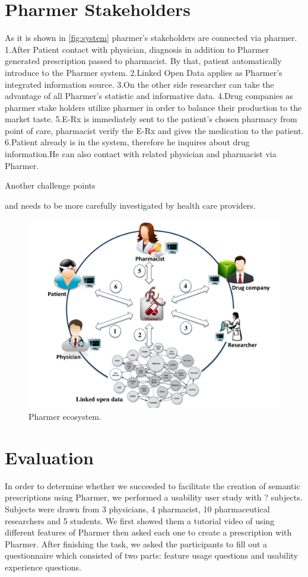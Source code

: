 \documentclass[10pt, conference, compsocconf]{IEEEtran}
\begin{document}
\section{Pharmer Stakeholders}
\label{sec:stake}

As it is shown in \autoref{fig:system} pharmer's stakeholders are connected via pharmer.
1.After Patient contact with physician, diagnosis in addition to Pharmer generated prescription passed to pharmacist. By that, patient automatically introduce to the Pharmer system.
2.Linked Open Data applies as Pharmer's integrated information source.
3.On the other side researcher can take the advantage of all Pharmer's statistic and informative data.
4.Drug companies as pharmer stake holders utilize pharmer in order to balance their production to the market taste.
5.E-Rx is immediately sent to the patient’s chosen pharmacy from point of care, pharmacist verify the E-Rx and gives the medication to the patient.
6.Patient already is in the system, therefore he inquires about drug information.He can also contact with related physician and pharmacist via Pharmer.


Another challenge points

 and needs to be more carefully investigated by health care providers.

\begin{figure}[tb]
	\centering
		\includegraphics[width=1.0\columnwidth]{images/system.pdf}
	\caption{Pharmer ecosystem.}
	\label{fig:system}
\end{figure}



\section{Evaluation}
\label{evaluation}
In order to determine whether we succeeded to facilitate the creation of semantic prescriptions using Pharmer, we performed a usability user study with ? subjects.
Subjects were drawn from 3 physicians, 4 pharmacist, 10 pharmaceutical researchers and 5 students.
We first showed them a tutorial video of using different features of Pharmer then asked each one to create a prescription with Pharmer.
After finishing the task, we asked the participants to fill out a questionnaire which consisted of two parts: feature usage questions and usability experience questions.
\end{document}
